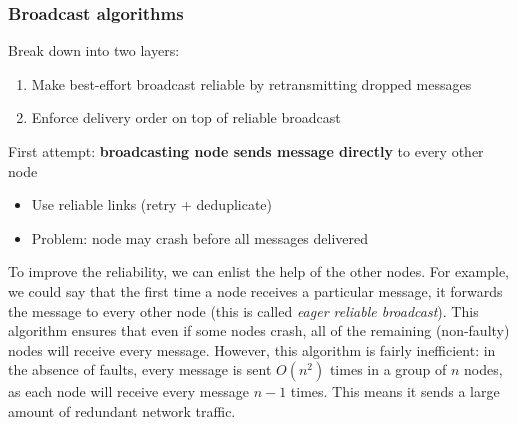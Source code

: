 \begin{frame}
    \label{s:broadcast-alg}
    \frametitle{Broadcast algorithms}
    Break down into two layers:
    \begin{enumerate}
        \item Make best-effort broadcast reliable by retransmitting dropped messages
        \item Enforce delivery order on top of reliable broadcast\\[1em]
    \end{enumerate}\pause
    First attempt: \textbf{broadcasting node sends message directly} to every other node
    \begin{itemize}
        \item Use reliable links (retry + deduplicate)\pause
        \item Problem: node may crash before all messages delivered\\[1em]
    \end{itemize}
    \begin{center}
    \end{center}%
\end{frame}
\label{l:broadcast-alg}

To improve the reliability, we can enlist the help of the other nodes.
For example, we could say that the first time a node receives a particular message, it forwards the message to every other node (this is called \emph{eager reliable broadcast}).
This algorithm ensures that even if some nodes crash, all of the remaining (non-faulty) nodes will receive every message.
However, this algorithm is fairly inefficient: in the absence of faults, every message is sent $O(n^2)$ times in a group of $n$ nodes, as each node will receive every message $n-1$ times.
This means it sends a large amount of redundant network traffic.

